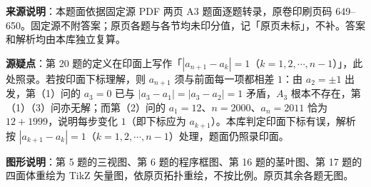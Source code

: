 


\begin{gktip}
\textbf{来源说明}：本题面依据固定源 PDF 两页 A3 题面逐题转录，原卷印刷页码 649–650。固定源不附答案；原页各题与各节均未印分值，记「原页未标」，不补。答案和解析均由本库独立复算。

\textbf{源疑点}：第 20 题的定义在印面上写作「$|a_{n+1}-a_k|=1$（$k=1,2,\cdots,n-1$）」，此处照录。若按印面下标理解，则 $a_{n+1}$ 须与前面每一项都相差 $1$：由 $a_2=\pm1$ 出发，第（1）问的 $a_3=0$ 已与 $|a_3-a_1|=|a_3-a_2|=1$ 矛盾，$A_3$ 根本不存在，第（1）（3）问亦无解；而第（2）问的 $a_1=12$、$n=2000$、$a_n=2011$ 恰为 $12+1999$，说明每步变化 $1$（即下标应为 $a_{k+1}$）。本库判定印面下标有误，解析按 $|a_{k+1}-a_k|=1$（$k=1,2,\cdots,n-1$）处理，题面仍照录印面。

\textbf{图形说明}：第 5 题的三视图、第 6 题的程序框图、第 16 题的茎叶图、第 17 题的四面体重绘为 TikZ 矢量图，依原页拓扑重绘，不按比例。原页其余各题无图。
\end{gktip}


